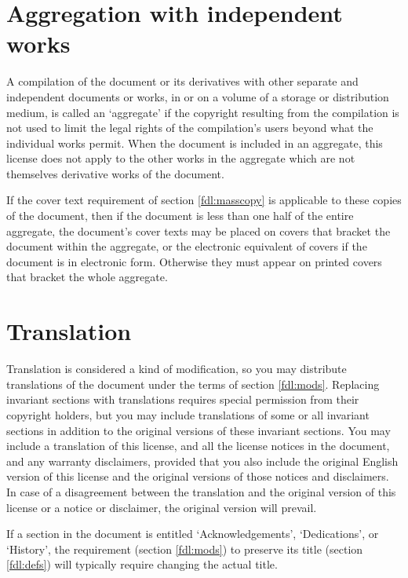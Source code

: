 \begin{multicols}{3}
\section{Aggregation with independent works}
\label{fdl:aggregat}

A compilation of the document or its derivatives with other separate and independent documents or works, in or on a volume of a storage or distribution medium, is called an \enquote*{aggregate} if the copyright resulting from the compilation is not used to limit the legal rights of the compilation's users beyond what the individual works permit. When the document is included in an aggregate, this license does not apply to the other works in the aggregate which are not themselves derivative works of the document.

If the cover text requirement of section \ref{fdl:masscopy} is applicable to these copies of the document, then if the document is less than one half of the entire aggregate, the document's cover texts may be placed on covers that bracket the document within the aggregate, or the electronic equivalent of covers if the document is in electronic form. Otherwise they must appear on printed covers that bracket the whole aggregate.

\section{Translation}

Translation is considered a kind of modification, so you may distribute translations of the document under the terms of section \ref{fdl:mods}. Replacing invariant sections with translations requires special permission from their copyright holders, but you may include translations of some or all invariant sections in addition to the original versions of these invariant sections. You may include a translation of this license, and all the license notices in the document, and any warranty disclaimers, provided that you also include the original English version of this license and the original versions of those notices and disclaimers. In case of a disagreement between the translation and the original version of this license or a notice or disclaimer, the original version will prevail.

If a section in the document is entitled \enquote*{Acknowledgements}, \enquote*{Dedications}, or \enquote*{History}, the requirement (section \ref{fdl:mods}) to preserve its title (section \ref{fdl:defs}) will typically require changing the actual title.


\end{multicols}
